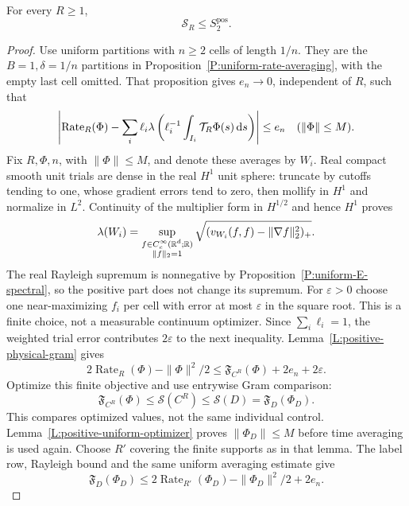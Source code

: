 \begin{proposition}
  \label{P:positive-signed-comparison}
  For every $R\ge1$,
  \begin{equation}\label{E:positive-signed-comparison}
    \mathcal S_R\le S_2^{\mathrm{pos}} .
  \end{equation}
\end{proposition}

\begin{proof}
  Use uniform partitions with $n\ge2$ cells of length $1/n$.
  They are the $B=1,\delta=1/n$ partitions in
  Proposition~\ref{P:uniform-rate-averaging}, with the empty last cell omitted.
  That proposition gives $e_n\to0$, independent of $R$, such that
  \[
    \left|\operatorname{Rate}_R(\Phi)
    -\sum_i\ell_i\lambda\left(\ell_i^{-1}
    \int_{I_i}\mathcal T_R\Phi(s)\,\mathrm{d} s\right)\right|\le e_n
    \quad(\|\Phi\|\le M).
  \]
  Fix $R,\Phi,n$, with $\|\Phi\|\le M$, and denote these averages by $W_i$.
  Real compact smooth unit trials are dense in the real $H^1$ unit sphere:
  truncate by cutoffs tending to one, whose gradient errors tend to zero,
  then mollify in $H^1$ and normalize in $L^2$.
  Continuity of the multiplier form in $H^{1/2}$ and hence $H^1$
  proves
  \[
    \lambda(W_i)=
    \sup_{\substack{f\in C_c^\infty(\mathbb{R}^d;\mathbb{R})\\\|f\|_2=1}}
    \sqrt{(v_{W_i}(f,f)-\|\nabla f\|_2^2)_+}.
  \]
  The real Rayleigh supremum is nonnegative by
  Proposition~\ref{P:uniform-E-spectral}, so the positive part
  does not change its supremum.
  For $\varepsilon>0$ choose one near-maximizing $f_i$ per cell
  with error at most $\varepsilon$ in the square root.
  This is a finite choice, not a measurable continuum optimizer.
  Since $\sum_i\ell_i=1$, the weighted trial error contributes
  $2\varepsilon$ to the next inequality.
  Lemma~\ref{L:positive-physical-gram} gives
  \[
    2\operatorname{Rate}_R(\Phi)-\|\Phi\|^2/2
    \le\mathfrak F_{C^R}(\Phi)+2e_n+2\varepsilon .
  \]
  Optimize this finite objective and use entrywise Gram comparison:
  \[
    \mathfrak F_{C^R}(\Phi)
    \le\mathscr S(C^R)\le\mathscr S(D)=\mathfrak F_D(\Phi_D).
  \]
  This compares optimized values, not the same individual control.
  Lemma~\ref{L:positive-uniform-optimizer} proves
  $\|\Phi_D\|\le M$ before time averaging is used again.
  Choose $R'$ covering the finite supports as in that lemma.
  The label row, Rayleigh bound and the same uniform averaging estimate give
  \begin{equation}\label{E:positive-finite-optimizer-bound}
    \mathfrak F_D(\Phi_D)
    \le2\operatorname{Rate}_{R'}(\Phi_D)-\|\Phi_D\|^2/2+2e_n .
  \end{equation}


\end{proof}

